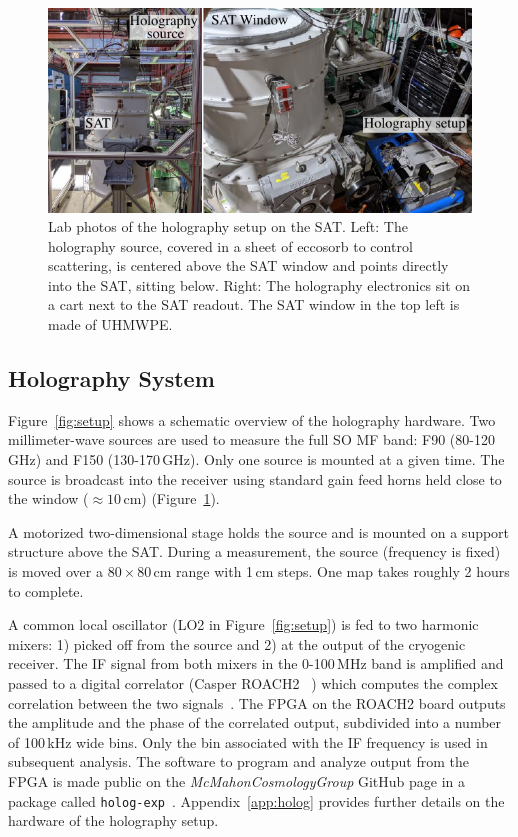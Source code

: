 \begin{figure}[t!]
    \centering
    \includegraphics[width = \textwidth]{Figures/sat_exp.pdf}
    \caption{Lab photos of the holography setup on the SAT.  Left: The holography source, covered in a sheet of eccosorb to control scattering, is centered above the SAT window and points directly into the SAT, sitting below.  Right: The holography electronics sit on a cart next to the SAT readout.  The SAT window in the top left is made of UHMWPE.}
    \label{fig:sat_hardware}
\end{figure}

\subsection{Holography System}
\label{sec:sat_meas_hardware}

Figure~\ref{fig:setup} shows a schematic overview of the holography hardware.  Two millimeter-wave sources are used to measure the full SO MF band: F90 (80-120\,GHz) and F150 (130-170\,GHz).  Only one source is mounted at a given time.  The source is broadcast into the receiver using standard gain feed horns held close to the window ($\approx10$\,cm) (Figure~\ref{fig:sat_hardware}).

A motorized two-dimensional stage holds the source and is mounted on a support structure above the SAT.  During a measurement, the source (frequency is fixed) is moved over a $80\times80$\,cm range with 1\,cm steps.  One map takes roughly 2 hours to complete.

A common local oscillator (LO2 in Figure~\ref{fig:setup}) is fed to two harmonic mixers: 1) picked off from the source and 2) at the output of the cryogenic receiver.  The IF signal from both mixers in the 0-100\,MHz band is amplified and passed to a digital correlator (Casper ROACH2 ~\cite{roach2}) which computes the complex correlation between the two signals~\cite{ches18}.  The FPGA on the ROACH2 board outputs the amplitude and the phase of the correlated output, subdivided into a number of 100\,kHz wide bins.  Only the bin associated with the IF frequency is used in subsequent analysis.  The software to program and analyze output from the FPGA is made public on the \textit{McMahonCosmologyGroup} GitHub page in a package called \verb|holog-exp|~\cite{holog-exp}.  Appendix~\ref{app:holog} provides further details on the hardware of the holography setup.


